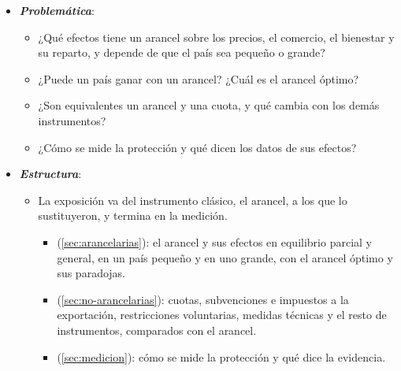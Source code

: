 \documentclass[11pt]{article}
\begin{document}
\begin{itemize}
\begin{itemize}
  \item \emph{Historia}: los mercantilistas defendían la protección, y \textcite{Hume1752Balance} y \textcite{Ricardo1817Principles} la rebatieron. En el siglo~XX, las rondas del GATT, desde su firma en 1947 hasta la Ronda Uruguay (1986-1994), bajaron los aranceles\nocite{OMC2026GATT}, pero desde los años 70~crecieron las barreras no arancelarias (el «neoproteccionismo»), y desde 2018 los aranceles han vuelto.
  \item Esta exposición estudia los instrumentos y sus efectos con competencia perfecta y, como extensión, con un monopolio nacional. La completan la política comercial estratégica con oligopolio , los efectos sobre el crecimiento , la eliminación discriminatoria de barreras  y las reglas multilaterales .
  \end{itemize}

\item \textbf{\emph{Problemática}}:
  \begin{itemize}
  \item ¿Qué efectos tiene un arancel sobre los precios, el comercio, el bienestar y su reparto, y depende de que el país sea pequeño o grande?
  \item ¿Puede un país ganar con un arancel? ¿Cuál es el arancel óptimo?
  \item ¿Son equivalentes un arancel y una cuota, y qué cambia con los demás instrumentos?
  \item ¿Cómo se mide la protección y qué dicen los datos de sus efectos?
  \end{itemize}

\item \textbf{\emph{Estructura}}:
  \begin{itemize}
  \item La exposición va del instrumento clásico, el arancel, a los que lo sustituyeron, y termina en la medición.
  \begin{itemize}
  \item {} (\ref{sec:arancelarias}): el arancel y sus efectos en equilibrio parcial y general, en un país pequeño y en uno grande, con el arancel óptimo y sus paradojas.
  \item {} (\ref{sec:no-arancelarias}): cuotas, subvenciones e impuestos a la exportación, restricciones voluntarias, medidas técnicas y el resto de instrumentos, comparados con el arancel.
  \item {} (\ref{sec:medicion}): cómo se mide la protección y qué dice la evidencia.
  \end{itemize}
  \end{itemize}
\end{itemize}
\end{document}
